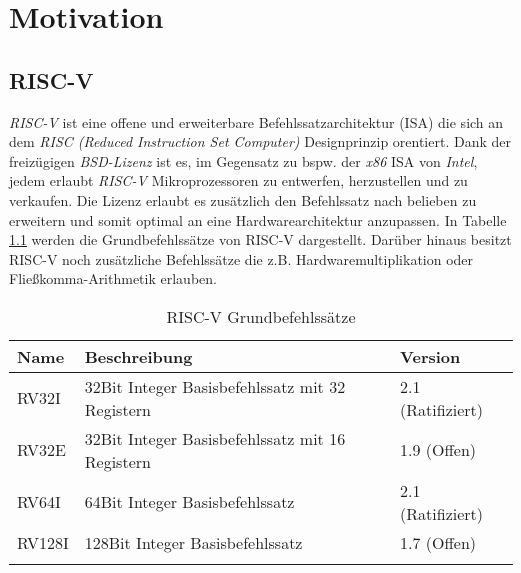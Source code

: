 \chapter{Motivation}

    \section{RISC-V}
        \textit{RISC-V} ist eine offene und erweiterbare Befehlssatzarchitektur (ISA) die sich an dem
        \textit{RISC (Reduced Instruction Set Computer)} Designprinzip orentiert.
        Dank der freizügigen \textit{BSD-Lizenz} ist es, im Gegensatz zu bspw. der \textit{x86} ISA von \textit{Intel},
        jedem erlaubt \textit{RISC-V} Mikroprozessoren zu entwerfen, herzustellen und zu verkaufen.
        Die Lizenz erlaubt es zusätzlich den Befehlssatz nach belieben zu erweitern und somit
        optimal an eine Hardwarearchitektur anzupassen.
        In Tabelle \ref{label:riscv-base} werden die Grundbefehlssätze von RISC-V dargestellt.
        Darüber hinaus besitzt RISC-V noch zusätzliche Befehlssätze die z.B. Hardwaremultiplikation
        oder Fließkomma-Arithmetik erlauben. \cite{riscv-isa-specs}
        
        \begin{center}
            \begin{longtable}{| l | l | l |}
                \hline
                    Name & Beschreibung & Version \\
                \hline
                    RV32I & 32Bit Integer Basisbefehlssatz mit 32 Registern & 2.1 (Ratifiziert)\\
                \hline
                    RV32E & 32Bit Integer Basisbefehlssatz mit 16 Registern & 1.9 (Offen)\\
                \hline
                    RV64I & 64Bit Integer Basisbefehlssatz & 2.1 (Ratifiziert)\\
                \hline
                    RV128I & 128Bit Integer Basisbefehlssatz & 1.7 (Offen)\\
                \hline
                \caption{RISC-V Grundbefehlssätze}
                \label{label:riscv-base}
            \end{longtable}
        \end{center}

